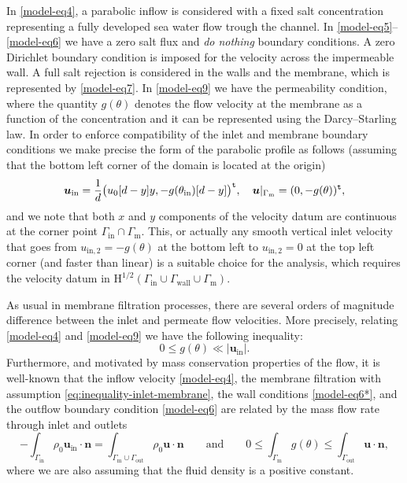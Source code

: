 \documentclass[onefignum,onetabnum,reqno,a4paper,final]{siamart250211}
\newcommand\bu{\boldsymbol{u}}
\newcommand\bn{\boldsymbol{n}}
\newcommand\0{\mathbf{0}}
\newcommand\bH{\boldsymbol{\mathrm{H}}}
\newcommand\Gm{\Gamma_{\mathrm{m}}}
\newcommand\Gi{\Gamma_{\mathrm{in}}}
\newcommand\Go{\Gamma_{\mathrm{out}}}
\newcommand\Gw{\Gamma_{\mathrm{wall}}}
\newcommand\buin{\boldsymbol{u}_{\mathrm{in}}}
\numberwithin{figure}{section}
\numberwithin{table}{section}
\begin{document}
	In \eqref{model-eq4}, a parabolic inflow is considered with a fixed salt concentration representing a fully developed sea water flow trough the channel.     In \eqref{model-eq5}--\eqref{model-eq6} we have a zero salt flux and \textit{do nothing} boundary conditions. A zero Dirichlet boundary condition is imposed for the velocity across the impermeable wall. A full salt rejection is considered in the walls and the membrane, which is represented by \eqref{model-eq7}. In \eqref{model-eq9} we have the permeability condition, where the quantity $g(\theta)$ denotes the flow velocity at the membrane as a function of the concentration and it can be represented using the Darcy--Starling law. In order to enforce compatibility of the inlet and membrane boundary conditions we make precise the form of the parabolic profile as follows (assuming that the bottom left corner of the domain is located at the origin)
    \[ \bu_{\mathrm{in}} = \frac{1}{d}\bigl(u_0[d-y]y,-g(\theta_{\mathrm{in}})[d-y]\bigr)^{\tt t}, \quad \bu|_{\Gm} = (0,-g(\theta))^{\tt t},\]
    and we note that both $x$ and $y$ components of the velocity datum are continuous at the corner point $\Gi\cap \Gm$. This, or actually any smooth vertical inlet velocity that goes from  $u_\mathrm{in,2}=-g(\theta)$ at the bottom left to $u_{\mathrm{in,2}} = 0 $ at the top left corner (and faster than linear) is a suitable choice for the analysis, which requires the velocity datum in $\bH^{1/2}(\Gi\cup\Gw \cup\Gm)$.
    
    As usual in membrane filtration processes, there are several orders of magnitude difference between the inlet and permeate flow velocities. More precisely, relating \eqref{model-eq4} and \eqref{model-eq9} we have the following inequality:
	\begin{equation}
		\label{eq:inequality-inlet-membrane}
		0\leq g(\theta) \ll \vert \buin\vert.
	\end{equation}
	Furthermore, and motivated by mass conservation properties of the flow, it is well-known that the inflow velocity \eqref{model-eq4}, the membrane filtration with assumption \eqref{eq:inequality-inlet-membrane}, the wall conditions \eqref{model-eq6*}, and the outflow boundary condition \eqref{model-eq6} are related by the mass flow rate through inlet and outlets 
 \begin{equation}
     \label{eq:conservation}
    - \int_{\Gi}\rho_0 \buin\cdot\bn =  \int_{\Gm\cup\Go} \rho_0\bu\cdot\bn \qquad \text{and}\qquad 0\leq  \int_{\Gm}  g(\theta) \leq \int_{\Go} \bu\cdot\bn,  
 \end{equation}
	where we are also assuming that the fluid density is a positive constant. 
\end{document}

